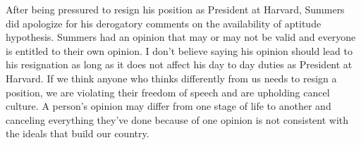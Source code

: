 \par
After being pressured to resign his position as President at Harvard, Summers did apologize for his derogatory 
comments on the availability of aptitude hypothesis. Summers had an opinion that may or may not be valid and 
everyone is entitled to their own opinion. I don’t believe saying his opinion should lead to his resignation 
as long as it does not affect his day to day duties as President at Harvard. If we think anyone who thinks 
differently from us needs to resign a position, we are violating their freedom of speech and are upholding 
cancel culture. A person's opinion may differ from one stage of life to another and canceling everything 
they've done because of one opinion is not consistent with the ideals that build our country.	

\clearpage
